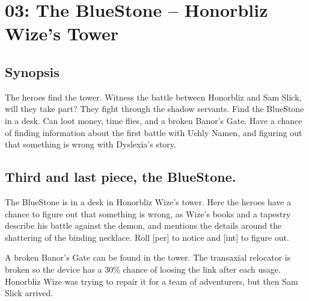 \documentclass[11pt, twoside, titlepage, a4paper]{report}
\renewcommand{\chaptermark}[1]{\markboth{#1}{}}
\begin{document}


\clearpage
{}
\section*{03: The BlueStone -- Honorbliz Wize's Tower}
\chaptermark{blue stone}


\subsection*{Synopsis}
The heroes find the tower. Witness the battle between Honorbliz and Sam Slick, will they take part? They fight through the shadow servants. Find the BlueStone in a desk. Can loot money, time flies, and a broken Banor's Gate. Have a chance of finding information about the first battle with Uchly Namen, and figuring out that something is wrong with Dyslexia's story.


\subsection*{Third and last piece, the BlueStone.}
The BlueStone is in a desk in Honorbliz Wize's tower.
Here the heroes have a chance to figure out that something is wrong, as Wize's books and a tapestry describe his battle against the demon, and mentions the details around the shattering of the binding necklace.
Roll [per] to notice and [int] to figure out.

A broken Banor's Gate can be found in the tower. The transaxial relocator is broken so the device has a 30\% chance of loosing the link after each usage. Honorbliz Wize was trying to repair it for a team of adventurers, but then Sam Slick arrived.
\end{document}
